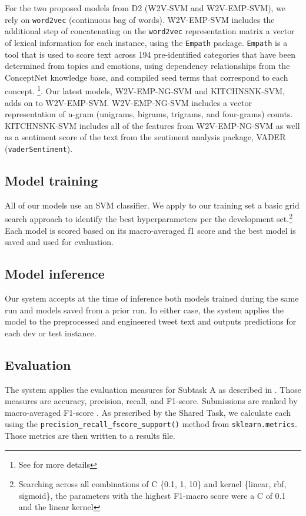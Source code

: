 \documentclass[11pt,a4paper]{article}
\begin{document}
For the two proposed models from D2 (W2V-SVM and W2V-EMP-SVM), we rely on \verb|word2vec| (continuous bag of words). W2V-EMP-SVM includes the additional step of concatenating on the \verb|word2vec| representation matrix a vector of lexical information for each instance, using the \verb|Empath| package. \verb|Empath| is a tool that is used to score text across 194 pre-identified categories that have been determined from topics and emotions, using dependency relationships from the ConceptNet knowledge base, and compiled seed terms that correspond to each concept. \footnote{See \citet{fast2016empath} for more details}. Our latest models, W2V-EMP-NG-SVM and KITCHNSNK-SVM, adds on to W2V-EMP-SVM. W2V-EMP-NG-SVM includes a vector representation of n-gram (unigrams, bigrams, trigrams, and four-grams) counts. KITCHNSNK-SVM includes all of the features from W2V-EMP-NG-SVM as well as a sentiment score of the text from the sentiment analysis package, VADER (\verb|vaderSentiment|).



\subsection{Model training}
All of our models use an SVM classifier. We apply to our training set a basic grid search approach to identify the best hyperparameters per the development set.\footnote{Searching across all combinations of C \{0.1, 1, 10\} and kernel \{linear, rbf, sigmoid\}, the parameters with the highest F1-macro score were a C of 0.1 and the linear kernel} Each model is scored based on its macro-averaged f1 score and the best model is saved and used for evaluation.


\subsection{Model inference}
Our system accepts at the time of inference both models trained during the same run and models saved from a prior run. In either case, the system applies the model to the preprocessed and engineered tweet text and outputs predictions for each dev or test instance.


\subsection{Evaluation}
The system applies the evaluation measures for Subtask A as described in \citet{basile-etal-2019-semeval}. Those measures are accuracy, precision, recall, and F1-score. Submissions are ranked by macro-averaged F1-score \citep{basile-etal-2019-semeval}. As prescribed by the Shared Task, we calculate each using the \verb|precision_recall_fscore_support()| method from \verb|sklearn.metrics|. Those metrics are then written to a results file.
\end{document}
